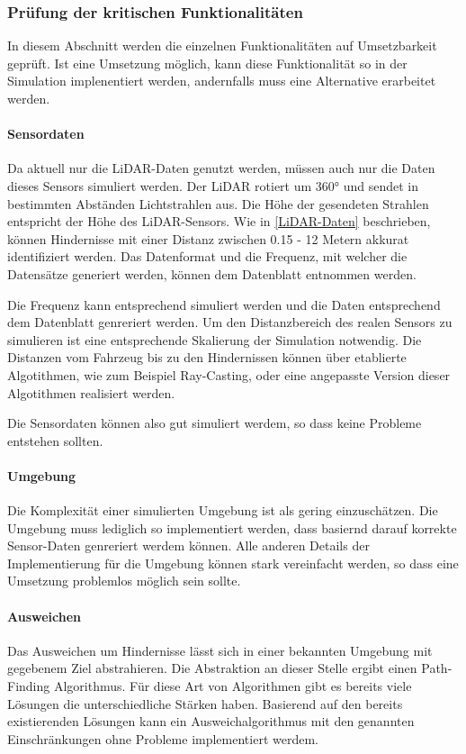 \subsubsection{Prüfung der kritischen Funktionalitäten}
\label{pr}

In diesem Abschnitt werden die einzelnen Funktionalitäten auf Umsetzbarkeit geprüft. 
Ist eine Umsetzung möglich, kann diese Funktionalität so in der Simulation implenentiert werden, andernfalls muss eine Alternative erarbeitet werden.

\paragraph{Sensordaten}
Da aktuell nur die LiDAR-Daten genutzt werden, müssen auch nur die Daten dieses Sensors simuliert werden.
Der LiDAR rotiert um 360° und sendet in bestimmten Abständen Lichtstrahlen aus. 
Die Höhe der gesendeten Strahlen entspricht der Höhe des LiDAR-Sensors.
Wie in \ref{LiDAR-Daten} beschrieben, können Hindernisse mit einer Distanz zwischen 0.15 - 12 Metern akkurat identifiziert werden. 
Das Datenformat und die Frequenz, mit welcher die Datensätze generiert werden, können dem Datenblatt \cite{Slamtec2020} entnommen werden.

Die Frequenz kann entsprechend simuliert werden und die Daten entsprechend dem Datenblatt genreriert werden. 
Um den Distanzbereich des realen Sensors zu simulieren ist eine entsprechende Skalierung der Simulation notwendig.
Die Distanzen vom Fahrzeug bis zu den Hindernissen können über etablierte Algotithmen, wie zum Beispiel Ray-Casting, 
oder eine angepasste Version dieser Algotithmen realisiert werden.

Die Sensordaten können also gut simuliert werdem, so dass keine Probleme entstehen sollten.

\paragraph{Umgebung}
Die Komplexität einer simulierten Umgebung ist als gering einzuschätzen.
Die Umgebung muss lediglich so implementiert werden, dass basiernd darauf korrekte Sensor-Daten genreriert werdem können.
Alle anderen Details der Implementierung für die Umgebung können stark vereinfacht werden, so dass eine Umsetzung problemlos möglich sein sollte.

\paragraph{Ausweichen}
Das Ausweichen um Hindernisse lässt sich in einer bekannten Umgebung mit gegebenem Ziel abstrahieren. 
Die Abstraktion an dieser Stelle ergibt einen Path-Finding Algorithmus. 
Für diese Art von Algorithmen gibt es bereits viele Lösungen die unterschiedliche Stärken haben.
Basierend auf den bereits existierenden Lösungen kann ein Ausweichalgorithmus mit den genannten Einschränkungen ohne Probleme implementiert werdem. 

